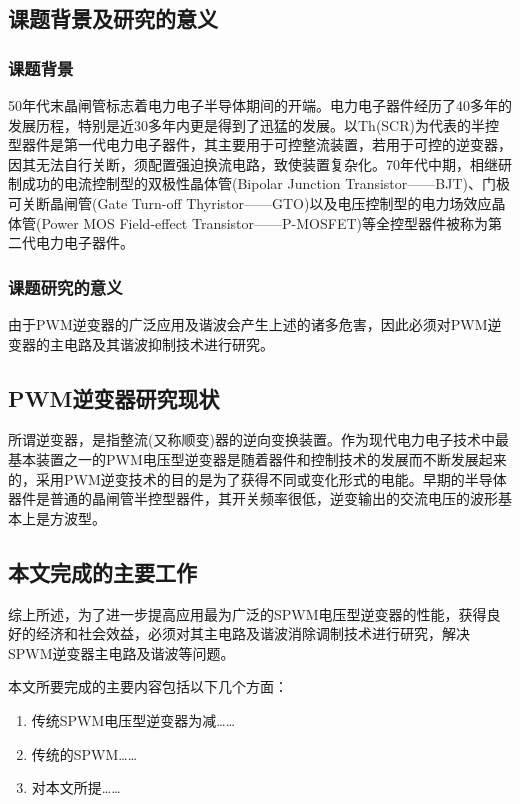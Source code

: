 \neepuprolegomenon%
\subsection{课题背景及研究的意义}%
\bodystyle
\subsubsection{课题背景}
50年代末晶闸管标志着电力电子半导体期间的开端。电力电子器件经历了40多年的发展历程，特别是近30多年内更是得到了迅猛的发展。以Th(SCR)为代表的半控型器件是第一代电力电子器件，其主要用于可控整流装置，若用于可控的逆变器，因其无法自行关断，须配置强迫换流电路，致使装置复杂化。70年代中期，相继研制成功的电流控制型的双极性晶体管(Bipolar Junction Transistor——BJT)、门极可关断晶闸管(Gate Turn-off Thyristor——GTO)以及电压控制型的电力场效应晶体管(Power MOS Field-effect Transistor——P-MOSFET)等全控型器件被称为第二代电力电子器件。\par

\subsubsection{课题研究的意义}
由于PWM逆变器的广泛应用及谐波会产生上述的诸多危害，因此必须对PWM逆变器的主电路及其谐波抑制技术进行研究。\par


\subsection{PWM逆变器研究现状}

所谓逆变器，是指整流(又称顺变)器的逆向变换装置。作为现代电力电子技术中最基本装置之一的PWM电压型逆变器是随着器件和控制技术的发展而不断发展起来的，采用PWM逆变技术的目的是为了获得不同或变化形式的电能。早期的半导体器件是普通的晶闸管半控型器件，其开关频率很低，逆变输出的交流电压的波形基本上是方波型。

\subsection{本文完成的主要工作}
综上所述，为了进一步提高应用最为广泛的SPWM电压型逆变器的性能，获得良好的经济和社会效益，必须对其主电路及谐波消除调制技术进行研究，解决SPWM逆变器主电路及谐波等问题。\par
本文所要完成的主要内容包括以下几个方面：

\begin{enumerate}[ref1label=(\arabic*),topsep=0pt,itemsep=0pt,parsep=0pt,leftmargin=1.5cm]                                                                                                                                      
\item 传统SPWM电压型逆变器为减……                                                                                                                                            
\item 传统的SPWM…… 
\item 对本文所提……                                                                                                                                          
\end{enumerate}    